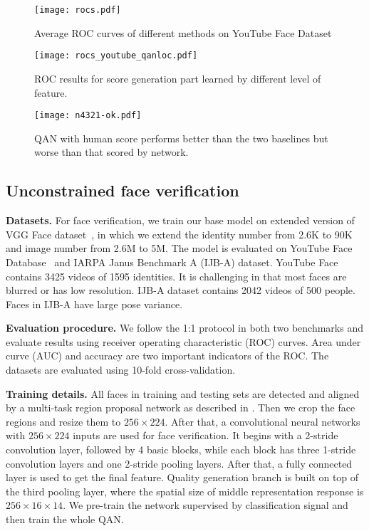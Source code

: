 \documentclass[10pt,twocolumn,letterpaper]{article}
\begin{document}
\begin{figure*}[!htb]
\center
  \texttt{[image: rocs.pdf]}
  \caption{Average ROC curves of different methods on YouTube Face Dataset}
  \label{fig:rocs}
\endminipage\hfill
{}\center
  \texttt{[image: rocs\_youtube\_qanloc.pdf]}
  \caption{ROC results for score generation part learned by different level of feature.}
  \label{fig:qanloc}
\endminipage
{}
\centering
  \texttt{[image: n4321-ok.pdf]}
  \caption{QAN with human score performs better than the two baselines but worse than that scored by network.\label{fig:roc4321}}
\endminipage


\end{figure*}

\subsection{Unconstrained face verification}
\textbf{Datasets.} For face verification, we train our base model on extended version of VGG Face dataset~\cite{Parkhi15}, in which we extend the identity number from 2.6K to 90K and image number from 2.6M to 5M. The model is evaluated on YouTube Face Database~\cite{wolf2011face} and IARPA Janus Benchmark A (IJB-A) dataset. YouTube Face contains 3425 videos of 1595 identities. It is challenging in that most faces are blurred or has low resolution. IJB-A dataset contains 2042 videos of 500 people. Faces in IJB-A have large pose variance.

\textbf{Evaluation procedure.} We follow the 1:1 protocol in both two benchmarks and evaluate results using receiver operating characteristic (ROC) curves. Area under curve (AUC) and accuracy are two important indicators of the ROC. The datasets are evaluated using 10-fold cross-validation.

\textbf{Training details.}
All faces in training and testing sets are detected and aligned by a multi-task region proposal network as described in \cite{chen2016supervised}. Then we crop the face regions and resize them to $256\times 224$. After that, a convolutional neural networks with $256\times 224$ inputs are used for face verification. It begins with a 2-stride convolution layer, followed by 4 basic blocks, while each block has three 1-stride convolution layers and one 2-stride pooling layers. After that, a fully connected layer is used to get the final feature. Quality generation branch is built on top of the third pooling layer, where the spatial size of middle representation response is $256\times 16 \times 14$. We pre-train the network supervised by classification signal and then train the whole QAN.
\end{document}
